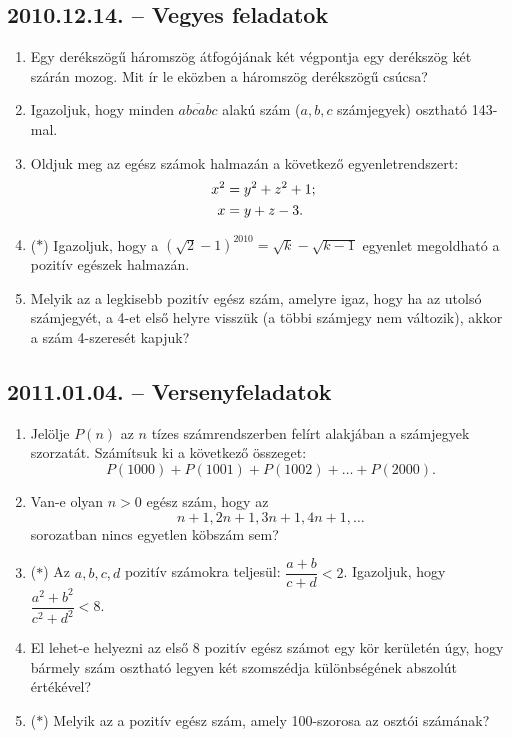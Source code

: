 \subsection*{2010.12.14. -- Vegyes feladatok}
\begin{enumerate}
\item Egy derékszögű háromszög átfogójának két végpontja egy derékszög két szárán mozog. Mit ír le eközben a háromszög derékszögű csúcsa?
\item Igazoljuk, hogy minden $\overline{abcabc}$ alakú szám ($a,b,c$ számjegyek)
osztható 143-mal.
\item Oldjuk meg az egész számok halmazán a következő egyenletrendszert:
\begin{align*}
x^2&=y^2+z^2+1;\cr
x&=y+z-3.
\end{align*}
\item ($*$) Igazoljuk, hogy a $\left(\sqrt{2}-1\right)^{2010}=\sqrt{k}-\sqrt{k-1}$
egyenlet megoldható a pozitív egészek halmazán.
\item Melyik az a legkisebb pozitív egész szám, amelyre igaz, hogy ha az utolsó 
számjegyét, a 4-et első helyre visszük (a többi számjegy nem változik), akkor a szám 4-szeresét kapjuk?
\end{enumerate}

\subsection*{2011.01.04. -- Versenyfeladatok}
\begin{enumerate}
\item Jelölje $P(n)$ az $n$ tízes számrendszerben felírt alakjában a számjegyek szorzatát. Számítsuk ki a következő összeget:
$$P(1000)+P(1001)+P(1002)+\ldots+P(2000).$$
\item Van-e olyan $n>0$ egész szám, hogy az
$$n+1, 2n+1, 3n+1, 4n+1, \ldots$$
sorozatban nincs egyetlen köbszám sem?
\item ($*$) Az $a,b,c,d$ pozitív számokra teljesül: $\dfrac{a+b}{c+d}<2$.
Igazoljuk, hogy $\dfrac{a^2+b^2}{c^2+d^2}<8$.
\item El lehet-e helyezni az első 8 pozitív egész számot egy kör kerületén úgy, hogy bármely szám osztható legyen két szomszédja különbségének abszolút értékével?
\item ($*$) Melyik az a pozitív egész szám, amely 100-szorosa az osztói számának?
\end{enumerate}

